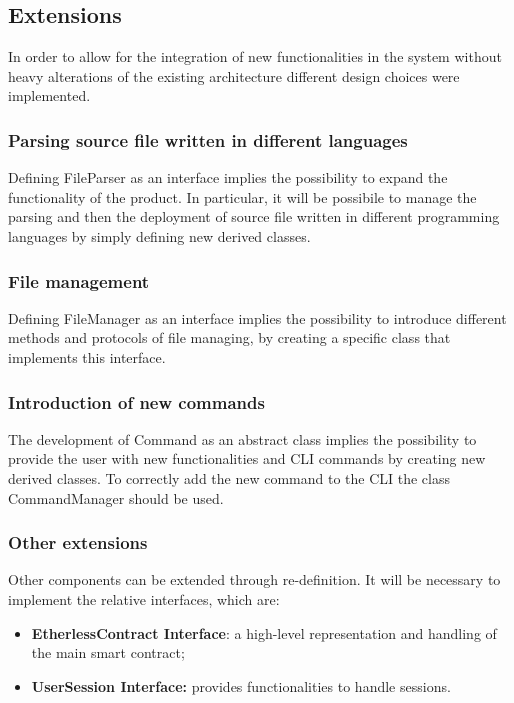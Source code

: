\subsection{Extensions}  
In order to allow for the integration of new functionalities in the system without heavy alterations of the existing architecture different design choices were implemented.

\subsubsection{Parsing source file written in different languages}
Defining FileParser as an interface implies the possibility to expand the functionality of the product. In particular, it will be possibile to manage the parsing and then the deployment of source file written in different programming languages by simply defining new derived classes. 

\subsubsection{File management}
Defining FileManager as an interface implies the possibility to introduce different methods and protocols of file managing, by creating a specific class that implements this interface. 

\subsubsection{Introduction of new commands}
The development of Command as an abstract class implies the possibility to provide the user with new functionalities and CLI commands by creating new derived classes. To correctly add the new command to the CLI the class CommandManager should be used.

\subsubsection{Other extensions}
Other components can be extended through re-definition. It will be necessary to implement the relative interfaces, which are:
\begin{itemize}
	\item \textbf{EtherlessContract Interface}: a high-level representation and handling of the main smart contract;
	\item \textbf{UserSession Interface:} provides functionalities to handle sessions.
\end{itemize}